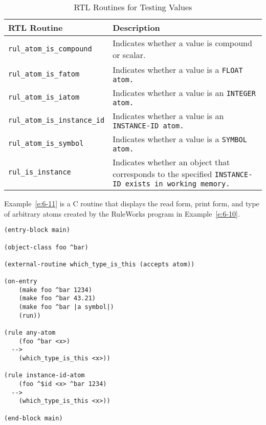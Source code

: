 \begin{table}[h]
  \begin{tabularx}{\columnwidth}{lX}
    \toprule
    RTL Routine &  Description \\
    \midrule
    \verb|rul_atom_is_compound| & Indicates whether a value is compound or 
                                  scalar. \\
    \verb|rul_atom_is_fatom| & Indicates whether a value is a \tt{FLOAT} atom. \\
    \verb|rul_atom_is_iatom| & Indicates whether a value is an \tt{INTEGER} atom. \\
    \verb|rul_atom_is_instance_id| & Indicates whether a value is an \tt{INSTANCE-ID}
                                     atom. \\
    \verb|rul_atom_is_symbol| & Indicates whether a value is a \tt{SYMBOL} atom. \\
    \verb|rul_is_instance| & Indicates whether an object that corresponds to
                             the specified \tt{INSTANCE-ID} exists in working    
                             memory. \\
    \bottomrule
  \end{tabularx}
  \caption{RTL Routines for Testing Values}
  \label{t:6-8}
\end{table}

Example~\ref{e:6-11} is a C routine that displays the read form, print
form, and type of arbitrary atoms created by the RuleWorks program in
Example~\ref{e:6-10}.

\begin{exampl}
\begin{verbatim}
(entry-block main)

(object-class foo ^bar)

(external-routine which_type_is_this (accepts atom))

(on-entry
    (make foo ^bar 1234)
    (make foo ^bar 43.21)
    (make foo ^bar |a symbol|)
    (run))

(rule any-atom
    (foo ^bar <x>)
  -->
    (which_type_is_this <x>))

(rule instance-id-atom
    (foo ^$id <x> ^bar 1234)
  -->
    (which_type_is_this <x>))

(end-block main)
\end{verbatim}
\label{e:6-10}
\end{exampl}

